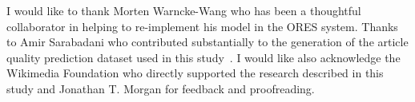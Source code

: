 I would like to thank Morten Warncke-Wang who has been a thoughtful collaborator in helping to re-implement his model in the ORES system. Thanks to Amir Sarabadani who contributed substantially to the generation of the article quality prediction dataset used in this study~\cite{halfaker16monthly}. I would like also acknowledge the Wikimedia Foundation who directly supported the research described in this study and Jonathan T. Morgan for feedback and proofreading.
